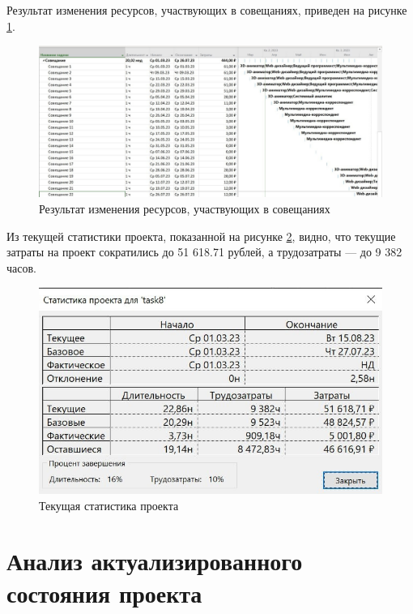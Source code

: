 Результат изменения ресурсов, участвующих в совещаниях, приведен на рисунке \ref{img:task8-result}.

\begin{figure}[H]
	\begin{center}
		\includegraphics[scale=0.25]{inc/img/task8-result.jpg}
	\end{center}
	\captionsetup{justification=centering}
	\caption{Результат изменения ресурсов, участвующих в совещаниях}
	\label{img:task8-result}
\end{figure}

Из текущей статистики проекта, показанной на рисунке \ref{img:task8-stat}, видно, что текущие затраты на проект сократились до 51 618.71 рублей, а трудозатраты --- до 9 382 часов.

\begin{figure}[H]
	\begin{center}
		\includegraphics[scale=0.3]{inc/img/task8-stat.jpg}
	\end{center}
	\captionsetup{justification=centering}
	\caption{Текущая статистика проекта}
	\label{img:task8-stat}
\end{figure}

\section*{Анализ актуализированного состояния проекта}

